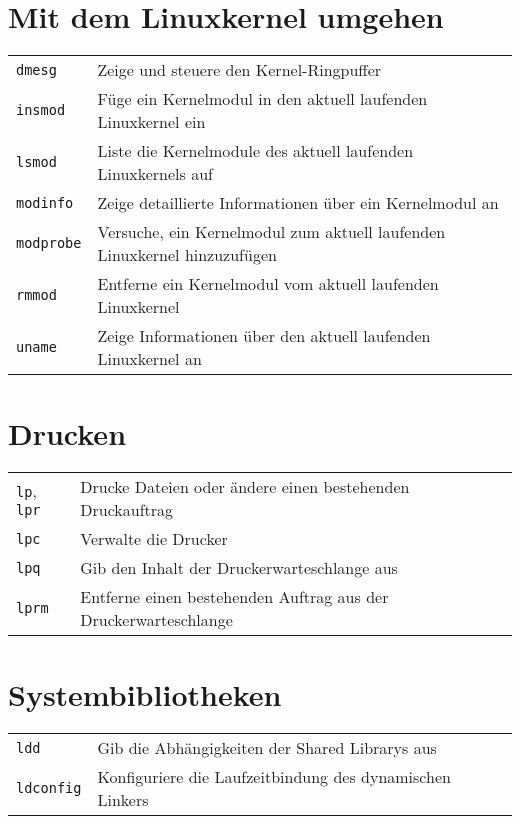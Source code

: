 \documentclass[10pt,a4paper]{article}
\begin{document}
\begin{multicols}{2}
\section{Mit dem Linuxkernel umgehen}
\begin{tabular}{ p{2.5cm} p{8.5cm} }
  \hline
  \texttt{dmesg} & Zeige und steuere den Kernel-Ringpuffer\\
  \rowcolor{Gray}
  \texttt{insmod} & Füge ein Kernelmodul in den aktuell laufenden Linux\-kernel ein\\
  \texttt{lsmod} & Liste die Kernelmodule des aktuell laufenden Linux\-kernels auf\\
  \rowcolor{Gray}
  \texttt{modinfo} & Zeige detaillierte Informationen über ein  Kernelmodul an\\
  \texttt{modprobe} & Versuche, ein Kernelmodul zum aktuell laufenden Linux\-kernel hinzuzufügen \\
  \rowcolor{Gray}
  \texttt{rmmod} & Entferne ein Kernelmodul vom aktuell laufenden Linux\-kernel \\
  \texttt{uname} & Zeige Informationen über den aktuell laufenden \newline Linuxkernel an\\
  \hline
\end{tabular}

\section{Drucken}
\begin{tabular}{ p{2.5cm} p{8.5cm} }
  \hline
  \texttt{lp}, \texttt{lpr} & Drucke Dateien oder ändere einen bestehenden Druckauftrag\\
  \rowcolor{Gray}
  \texttt{lpc} & Verwalte die Drucker \\
  \texttt{lpq} & Gib den Inhalt der Druckerwarteschlange aus\\
  \rowcolor{Gray}
  \texttt{lprm} & Entferne einen bestehenden Auftrag aus der Druckerwarteschlange \\
  \hline
\end{tabular}

\section{Systembibliotheken}

\begin{tabular}{ p{2.5cm} p{8.5cm} }
  \hline 
  \texttt{ldd} & Gib die Abhängigkeiten der Shared Librarys aus \\
  \rowcolor{Gray}
  \texttt{ldconfig} & Konfiguriere die Laufzeitbindung des dynamischen Linkers \\
  \hline
\end{tabular}


\end{multicols}
\end{document}
